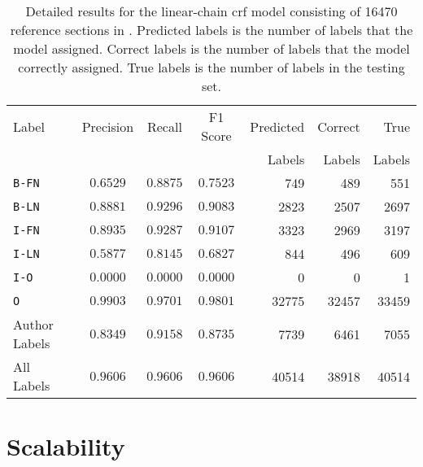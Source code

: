 \begin{table}[h]
  \centering
\begin{tabular}{l c c c r r r}
\toprule
Label  & Precision  & Recall &  F1 Score & Predicted  &Correct  & True  \\
  &   &  &   &  Labels & Labels &  Labels \\
\midrule
\texttt{B-FN}  & $0.6529$  & $0.8875$ & $0.7523$ & \num{749}   & \num{489}     &     \num{551}  \\
\texttt{B-LN}  & $0.8881$  & $0.9296$ & $0.9083$ & \num{2823}  & \num{2507}    &     \num{2697} \\
\texttt{I-FN}  & $0.8935$  & $0.9287$ & $0.9107$ & \num{3323}  & \num{2969}    &     \num{3197} \\
\texttt{I-LN}  & $0.5877$  & $0.8145$ & $0.6827$ & \num{844}   & \num{496}     &     \num{609} \\
\texttt{I-O}   & $0.0000$  & $0.0000$ & $0.0000$ & \num{0}     & \num{0}       &     \num{1} \\
\texttt{O}     & $0.9903$  & $0.9701$ & $0.9801$ & \num{32775} & \num{32457}   &     \num{33459}\\
\midrule
Author Labels  & $0.8349$  & $0.9158$ & $0.8735$ & \num{7739}  & \num{6461}    &     \num{7055}\\
All Labels     & $0.9606$  & $0.9606$ & $0.9606$ & \num{40514} & \num{38918}   &     \num{40514}\\
\bottomrule
\end{tabular}
\caption{Detailed results for the \gls{linear-chain crf} model consisting of \num{16470} reference sections in . Predicted labels is the number of labels that the model assigned. Correct labels is the number of labels that the model correctly assigned. True labels is the number of labels in the testing set.}
\label{tab:detailed-results}
\end{table}

\section{Scalability}\label{app:scalability}


